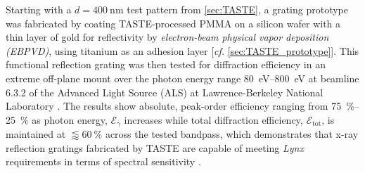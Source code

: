 Starting with a $d = \SI{400}{\nm}$ test pattern from \cref{sec:TASTE}, a grating prototype was fabricated by coating TASTE-processed PMMA on a silicon wafer with a thin layer of gold for reflectivity by \emph{electron-beam physical vapor deposition (EBPVD)}, using titanium as an adhesion layer [\emph{cf.\@} \cref{sec:TASTE_prototype}]. 
This functional reflection grating was then tested for diffraction efficiency in an extreme off-plane mount over the photon energy range \SIrange{80}{800}{\electronvolt} at beamline 6.3.2 of the Advanced Light Source (ALS) at Lawrence-Berkeley National Laboratory \cite{ALS_632,Underwood96,Gullikson01,LBNL_web}. 
The results show absolute, peak-order efficiency ranging from \SIrange{75}{25}{\percent} as photon energy, $\mathcal{E}_{\gamma}$ increases while total diffraction efficiency, $\mathscr{E}_{\text{tot}}$, is maintained at $\lessapprox \SI{60}{\percent}$ across the tested bandpass, which demonstrates that x-ray reflection gratings fabricated by TASTE are capable of meeting \emph{Lynx} requirements in terms of spectral sensitivity \cite[\emph{cf.\@} \cref{sec:taste_eff_results}]{McCoy20}. 
